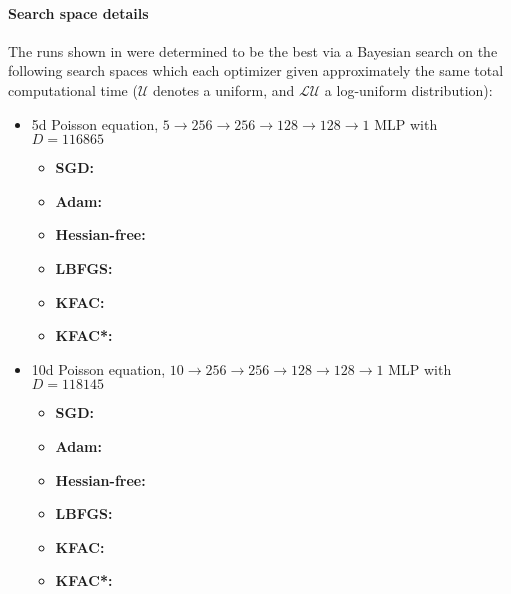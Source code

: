 \paragraph{Search space details} The runs shown in  were determined to be the best via a Bayesian search on the following search spaces which each optimizer given approximately the same total computational time ($\mathcal{U}$ denotes a uniform, and $\mathcal{LU}$ a log-uniform distribution):
\begin{itemize}

\item 5d Poisson equation, $5 \to 256 \to 256 \to 128 \to 128 \to 1$ MLP with $D=\num{116865}$
  \begin{itemize}
    \def\pathToRuns{kfac_pinns_exp/exp26_poisson5d_mlp_tanh_256_bayes/tex}
  \item \textbf{SGD:} 
  \item \textbf{Adam:} 
  \item \textbf{Hessian-free:} 
  \item \textbf{LBFGS:} 
  \item \textbf{KFAC:} 
  \item \textbf{KFAC*:} 
  \end{itemize}

\item 10d Poisson equation, $10 \to 256 \to 256 \to 128 \to 128 \to 1$ MLP with $D=\num{118145}$
  \begin{itemize}
    \def\pathToRuns{kfac_pinns_exp/exp32_poisson10d_mlp_tanh_256_bayes/tex}
  \item \textbf{SGD:} 
  \item \textbf{Adam:} 
  \item \textbf{Hessian-free:} 
  \item \textbf{LBFGS:} 
  \item \textbf{KFAC:} 
  \item \textbf{KFAC*:} 
  \end{itemize}


\end{itemize}
